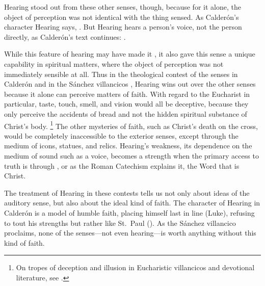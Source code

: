 Hearing stood out from these other senses, though, because for it alone, the object of perception was not identical with the thing sensed.
As Calderón's character Hearing says, .%
  \autocite[]{Calderon:Retiro}
But Hearing hears a person's voice, not the person directly, as Calderón's text continues: .%
  \autocite[]{Calderon:Retiro}

While this feature of hearing may have made it , it also gave this sense a unique capability in spiritual matters, where the object of perception was not immediately sensible at all.
Thus in the theological contest of the senses in Calderón and in the Sánchez villancicos , Hearing wins out over the other senses because it alone can perceive matters of faith.
With regard to the Eucharist in particular, taste, touch, smell, and vision would all be deceptive, because they only perceive the accidents of bread and not the hidden spiritual substance of Christ's body.%
  \footnote{On tropes of deception and illusion in Eucharistic villancicos and devotional literature, see \autocite{Cashner:Cards}.}
The other mysteries of faith, such as Christ's death on the cross, would be completely inaccessible to the exterior senses, except through the medium of icons, statues, and relics.
Hearing's weakness, its dependence on the medium of sound such as a voice, becomes a strength when the primary access to truth is through , or as the Roman Catechism explains it, the Word that is Christ.

The treatment of Hearing in these contests tells us not only about ideas of the auditory sense, but also about the ideal kind of faith.
The character of Hearing in Calderón is a model of humble faith, placing himself last in line (Luke), refusing to tout his strengths but rather  like St.\ Paul ().
As the Sánchez villancico proclaims, none of the senses---not even hearing---is worth anything without this kind of faith.

